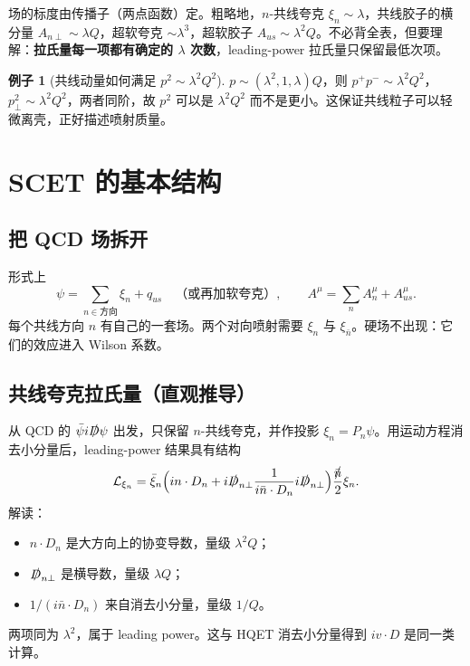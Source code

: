 \documentclass[11pt,a4paper]{article}
\theoremstyle{definition}
\newtheorem{example}{例子}[section]
\theoremstyle{plain}
\theoremstyle{remark}
\newcommand{\slashnb}{\slashed{\bar n}}
\begin{document}
场的标度由传播子（两点函数）定。粗略地，$n$-共线夸克 $\xi_n\sim\lambda$，共线胶子的横分量 $A_{n\perp}\sim\lambda Q$，超软夸克 $\sim\lambda^3$，超软胶子 $A_{us}\sim\lambda^2 Q$。不必背全表，但要理解：\textbf{拉氏量每一项都有确定的 $\lambda$ 次数}，leading-power 拉氏量只保留最低次项。

\begin{example}[共线动量如何满足 $p^2\sim\lambda^2 Q^2$]
$p\sim(\lambda^2,1,\lambda)Q$，则 $p^+p^-\sim\lambda^2 Q^2$，$p_\perp^2\sim\lambda^2 Q^2$，两者同阶，故 $p^2$ 可以是 $\lambda^2 Q^2$ 而不是更小。这保证共线粒子可以轻微离壳，正好描述喷射质量。
\end{example}

\section{SCET 的基本结构}
\label{sec:structure}

\subsection{把 QCD 场拆开}

形式上
\begin{equation}
  \psi=\sum_{n\in\text{方向}}\xi_n+q_{us}\quad\text{（或再加软夸克）},\qquad
  A^\mu=\sum_n A_n^\mu+A_{us}^\mu.
\end{equation}
每个共线方向 $n$ 有自己的一套场。两个对向喷射需要 $\xi_n$ 与 $\xi_{\bar n}$。硬场不出现：它们的效应进入 Wilson 系数。

\subsection{共线夸克拉氏量（直观推导）}

从 QCD 的 $\bar\psi i\slashed{D}\psi$ 出发，只保留 $n$-共线夸克，并作投影 $\xi_n=P_n\psi$。用运动方程消去小分量后，leading-power 结果具有结构
\begin{equation}
\label{eq:Lxi}
  \mathcal{L}_{\xi_n}=\bar\xi_n\Bigl(in\cdot D_n+i\slashed{D}_{n\perp}\frac{1}{i\bar n\cdot D_n}i\slashed{D}_{n\perp}\Bigr)\frac{\slashnb}{2}\xi_n.
\end{equation}
解读：
\begin{itemize}[leftmargin=1.4em]
  \item $n\cdot D_n$ 是大方向上的协变导数，量级 $\lambda^2 Q$；
  \item $\slashed{D}_{n\perp}$ 是横导数，量级 $\lambda Q$；
  \item $1/(i\bar n\cdot D_n)$ 来自消去小分量，量级 $1/Q$。
\end{itemize}
两项同为 $\lambda^2$，属于 leading power。这与 HQET 消去小分量得到 $iv\cdot D$ 是同一类计算。
\end{document}

